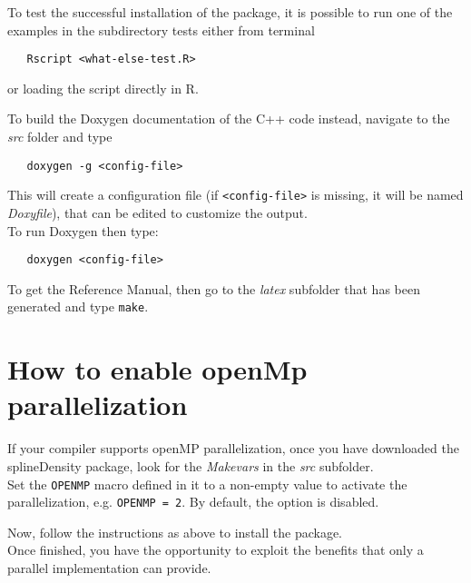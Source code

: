To test the successful installation of the package, it is possible to run one of the examples in the subdirectory tests either from terminal
\begin{verbatim}
   Rscript <what-else-test.R>
\end{verbatim}
or loading the script directly in R.

To build the Doxygen documentation of the C++ code instead, navigate to the \textit{src} folder and type 
\begin{verbatim}
   doxygen -g <config-file>
\end{verbatim}
This will create a configuration file (if \verb|<config-file>| is missing, it will be named \textit{Doxyfile}), that can be edited to customize the output. \\
To run Doxygen then type:
\begin{verbatim}
   doxygen <config-file>
\end{verbatim}
To get the Reference Manual, then go to the \textit{latex} subfolder that has been generated and type \verb|make|.




\section{How to enable openMp parallelization}
If your compiler supports openMP parallelization, once you have downloaded the splineDensity package, look for the \textit{Makevars} in the \textit{src} subfolder.\\
Set the \verb|OPENMP| macro defined in it to a non-empty value to activate the parallelization, e.g. \verb|OPENMP = 2|. By default, the option is disabled.

Now, follow the instructions as above to install the package. \\
Once finished, you have the opportunity to exploit the benefits that only a parallel implementation can provide.
